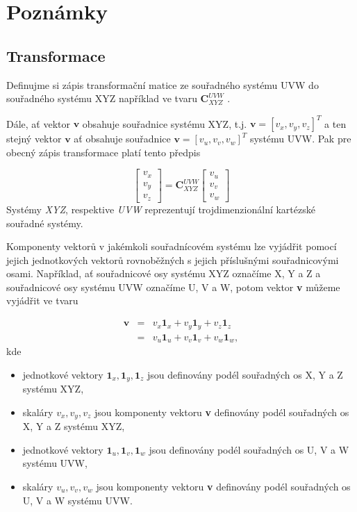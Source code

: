 \documentclass[11pt,a4paper]{article}
\begin{document}
\section{Poznámky}

\subsection{Transformace}

Definujme si zápis transformační matice ze souřadného systému UVW do souřadného systému XYZ například ve tvaru $\mathbf{C}_{XYZ}^{UVW}$ \cite{Grewal2001}.

Dále, ať vektor $\mathbf{v}$ obsahuje souřadnice systému XYZ, t.j. $\mathbf{v} = \left[v_{x}, v_{y}, v_{z}\right]^{T}$ a ten stejný vektor $\mathbf{v}$ ať obsahuje souřadnice $\mathbf{v} = \left[v_{u}, v_{v}, v_{w}\right]^{T}$ systému UVW. Pak pre obecný zápis transformace platí tento předpis

\begin{equation}
\begin{bmatrix}
v_{x} \\
v_{y} \\
v_{z}
\end{bmatrix} = \mathbf{C}^{UVW}_{XYZ}
\begin{bmatrix}
v_{u} \\
v_{v} \\
v_{w}
\end{bmatrix}
\label{rov:transGeneral}
\end{equation}
Systémy \textit{XYZ}, respektive \textit{UVW} reprezentují trojdimenzionální kartézské souřadné systémy.

Komponenty vektorů v jakémkoli souřadnícovém systému lze vyjádřit pomocí jejich jednotkových vektorů rovnoběžných s jejich příslušnými souřadnicovými osami. Například, ať souřadnicové osy systému XYZ označíme X, Y a Z a souřadnicové osy systému UVW označíme U, V a W, potom vektor \textbf{v} můžeme vyjádřit ve tvaru

\begin{eqnarray}
\mathbf{v} &=& v_{x}\mathbf{1}_{x} + v_{y}\mathbf{1}_{y} + v_{z}\mathbf{1}_{z} \\ \nonumber
           &=& v_{u}\mathbf{1}_{u} + v_{v}\mathbf{1}_{v} + v_{w}\mathbf{1}_{w}, 
\end{eqnarray}
kde
\begin{itemize}
\item jednotkové vektory $\mathbf{1}_{x}, \mathbf{1}_{y}, \mathbf{1}_{z}$ jsou definovány podél souřadných os X, Y a Z systému XYZ,
\item skaláry $v_{x}, v_{y}, v_{z}$ jsou komponenty vektoru \textbf{v} definovány podél souřadných os X, Y a Z systému XYZ,
\item jednotkové vektory $\mathbf{1}_{u}, \mathbf{1}_{v}, \mathbf{1}_{w}$ jsou definovány podél souřadných os U, V a W systému UVW, 
\item skaláry $v_{u}, v_{v}, v_{w}$ jsou komponenty vektoru \textbf{v} definovány podél souřadných os U, V a W systému UVW. 
\end{itemize}
\end{document}
